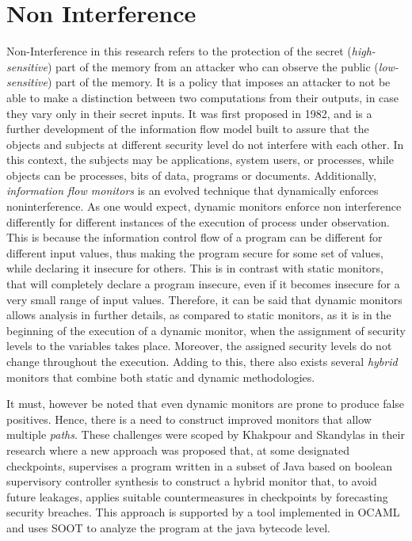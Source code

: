 \section{Non Interference}
\label{section:NonInterference}
Non-Interference in this research refers to the protection of the secret (\textit{high-sensitive}) part of the memory from an attacker who can observe the public (\textit{low-sensitive}) part of the memory\cite{Sabelfeld2005}. It is a policy that imposes an attacker to not be able to make a distinction between two computations from their outputs, in case they vary only in their secret inputs. It was first proposed in 1982\cite{Gougen1982}, and is a further development of the information flow model built to assure that the objects and subjects at different security level do not interfere with each other. In this context, the subjects may be applications, system users, or processes, while objects can be processes, bits of data, programs or documents. Additionally, \textit{information flow monitors} is an evolved technique that dynamically enforces noninterference. As one would expect, dynamic monitors enforce non interference differently for different instances of the execution of process under observation. This is because the information control flow of a program can be different for different input values, thus making the program secure for some set of values, while declaring it insecure for others. This is in contrast with static monitors, that will completely declare a program insecure, even if it becomes insecure for a very small range of input values. Therefore, it can be said that dynamic monitors allows analysis in further details, as compared to static monitors, as it is in the beginning of the execution of a dynamic monitor, when the assignment of security levels to the variables takes place. Moreover, the assigned security levels do not change throughout the execution. Adding to this, there also exists several \textit{hybrid} monitors \cite{Shroff2007, Russo2010, Guernic2007} that combine both static and dynamic methodologies.\par
It must, however be noted that even dynamic monitors are prone to produce false positives. Hence, there is a need to construct improved monitors that allow multiple \textit{paths}. These challenges were scoped by Khakpour and Skandylas in their research \cite{Khakpour2018} where a new approach was proposed that, at some designated checkpoints, supervises a program written in a subset of Java based on boolean supervisory controller synthesis \cite{BERTHIER201446} to construct a hybrid monitor that, to avoid future leakages, applies suitable countermeasures in checkpoints by forecasting security breaches. This approach is supported by a tool implemented in OCAML and uses SOOT to analyze the program at the java bytecode level.

